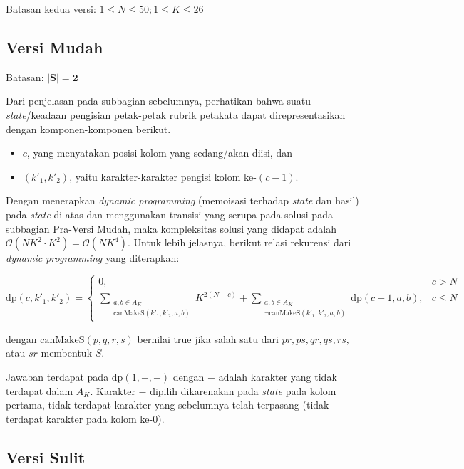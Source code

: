 \documentclass[../main_editorial.tex]{subfiles} %
\newcommand{\dpf}{\mathrm{dp}}
\newcommand{\mtrue}{\mathrm{true}}
\newcommand{\bigO}[1]{\mathcal{O}(#1)}
\begin{document}
Batasan kedua versi: $1 \le N \le 50; 1 \le K \le 26$

\subsection*{Versi Mudah}
Batasan: $\mathbf{|S| = 2}$

Dari penjelasan pada subbagian sebelumnya, perhatikan bahwa suatu \textit{state}/keadaan pengisian petak-petak rubrik petakata dapat direpresentasikan dengan komponen-komponen berikut.

\begin{itemize}
\item $ c $, yang menyatakan posisi kolom yang sedang/akan diisi, dan
\item $ (k'_1, k'_2) $, yaitu karakter-karakter pengisi kolom ke-$ (c-1) $.
\end{itemize}

Dengan menerapkan \textit{dynamic programming} (memoisasi terhadap \textit{state} dan hasil) pada \textit{state} di atas dan menggunakan transisi yang serupa pada solusi pada subbagian Pra-Versi Mudah, maka kompleksitas solusi yang didapat adalah $ \bigO{NK^2 \cdot K^2} = \bigO{NK^4} $. Untuk lebih jelasnya, berikut relasi rekurensi dari \textit{dynamic programming} yang diterapkan:

$$
\dpf(c, k'_1, k'_2) = 
\begin{cases} 
	0, & c > N\\
	\displaystyle \sum_{\substack{a, b \in A_K\\\mathrm{canMakeS}(k'_1, k'_2, a, b)}} K^{2(N-c)} 
	+ \displaystyle \sum_{\substack{a, b \in A_K\\\lnot\mathrm{canMakeS}(k'_1, k'_2, a, b)}} \dpf(c + 1, a, b), & c \le N
\end{cases}
$$

dengan $ \mathrm{canMakeS}(p, q, r, s) $ bernilai $ \mtrue $ jika salah satu dari $ pr, ps, qr, qs, rs, $ atau $ sr $ membentuk $ S $.

Jawaban terdapat pada $ \dpf(1, -, -) $ dengan $ - $ adalah karakter yang tidak terdapat dalam $ A_K $. Karakter $ - $ dipilih dikarenakan pada \textit{state} pada kolom pertama, tidak terdapat karakter yang sebelumnya telah terpasang (tidak terdapat karakter pada kolom ke-$ 0 $).

\subsection*{Versi Sulit}
\end{document}
